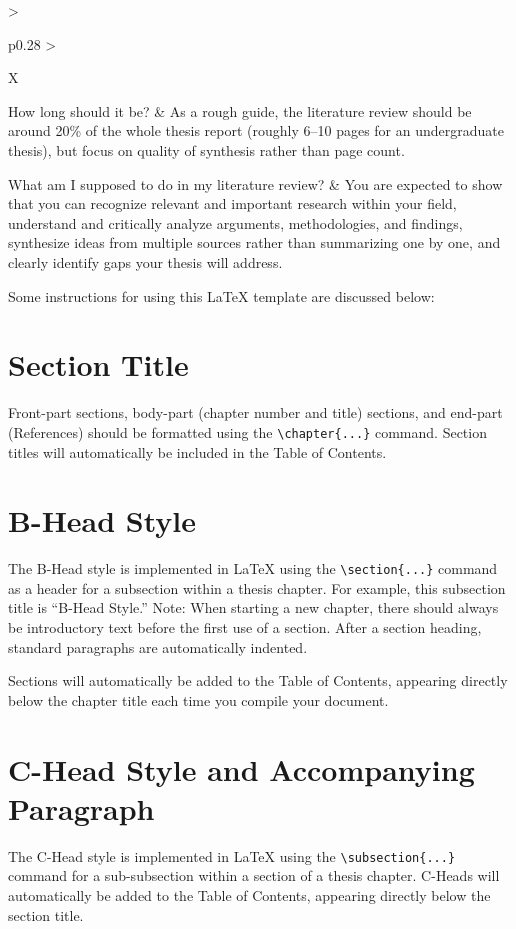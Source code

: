 \begin{xltabular}{\textwidth}{>{\bfseries\raggedright\arraybackslash}p{0.28\textwidth} >{\raggedright\arraybackslash}X}
  How long should it be? & 
  As a rough guide, the literature review should be around 20\% of the whole thesis report (roughly 6--10 pages for an undergraduate thesis), but focus on quality of synthesis rather than page count. \\
  \midrule

  What am I supposed to do in my literature review? & 
  You are expected to show that you can recognize relevant and important research within your field, understand and critically analyze arguments, methodologies, and findings, synthesize ideas from multiple sources rather than summarizing one by one, and clearly identify gaps your thesis will address. \\
\end{xltabular}

Some instructions for using this LaTeX template are discussed below:

\section{Section Title}
\label{sec:section-title}

Front-part sections, body-part (chapter number and title) sections, and end-part (References) should be formatted using the \texttt{\textbackslash chapter\{...\}} command. Section titles will automatically be included in the Table of Contents.

\section{B-Head Style}
\label{sec:b-head}

The B-Head style is implemented in LaTeX using the \texttt{\textbackslash section\{...\}} command as a header for a subsection within a thesis chapter. For example, this subsection title is ``B-Head Style.'' Note: When starting a new chapter, there should always be introductory text before the first use of a section. After a section heading, standard paragraphs are automatically indented.

Sections will automatically be added to the Table of Contents, appearing directly below the chapter title each time you compile your document.

\section{C-Head Style and Accompanying Paragraph}
\label{sec:c-head}

The C-Head style is implemented in LaTeX using the \texttt{\textbackslash subsection\{...\}} command for a sub-subsection within a section of a thesis chapter. C-Heads will automatically be added to the Table of Contents, appearing directly below the section title.

